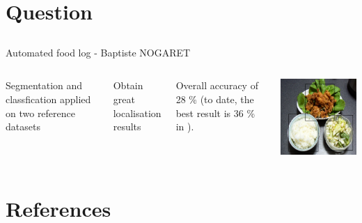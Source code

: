 \documentclass[aspectratio=169]{beamer}
\let\oldsection\section
\renewcommand{\section}[1]{
    \oldsection{#1}	
    \subsection{}
}
\newenvironment{myframe}[1][t]{\begin{frame}[#1]{\secname}{\subsecname}}{\end{frame}}
\begin{document}
     \section{Question}
    
    {
        \begin{frame}{Automated food log - Baptiste NOGARET}{}
            \begin{columns}
                Segmentation and classfication applied on two reference datasets
                
                \vspace{0.5cm}
                
                Obtain great localisation results
                
                \vspace{0.5cm}
                
                Overall accuracy of 28 \% (to date, the best result is 36 \% in \cite{Bolanos2016}).
                
                \centering
                \includegraphics[scale=0.5]{../img/seg_97_gt}
            \end{columns}
        \end{frame}
    }
    
    \section{References}
    
    \begin{myframe}[t, allowframebreaks]
        \printbibliography[heading=none]
    \end{myframe}
   
\end{document}

